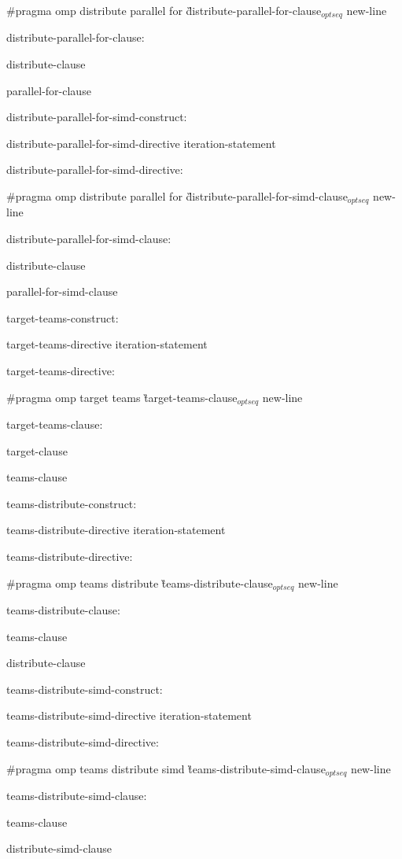 {\C\I \#pragma omp distribute parallel for \G distribute-parallel-for-clause$_{optseq}$ new-line

\I distribute-parallel-for-clause:

\I\I distribute-clause

\I\I parallel-for-clause

\I distribute-parallel-for-simd-construct:

\I\I distribute-parallel-for-simd-directive iteration-statement

\I distribute-parallel-for-simd-directive:

\C\I\I \#pragma omp distribute parallel for \G distribute-parallel-for-simd-clause$_{optseq}$ new-line

\I distribute-parallel-for-simd-clause:

\I\I distribute-clause

\I\I parallel-for-simd-clause

\I target-teams-construct:

\I\I target-teams-directive iteration-statement

\I target-teams-directive:

\C\I\I \#pragma omp target teams \G target-teams-clause$_{optseq}$ new-line

\I target-teams-clause:

\I\I target-clause

\I\I teams-clause

\I teams-distribute-construct:

\I\I teams-distribute-directive iteration-statement

\I teams-distribute-directive:

\C\I\I \#pragma omp teams distribute \G teams-distribute-clause$_{optseq}$ new-line

\I teams-distribute-clause:

\I\I teams-clause

\I\I distribute-clause

\I teams-distribute-simd-construct:

\I\I teams-distribute-simd-directive iteration-statement

\I teams-distribute-simd-directive:

\C\I \#pragma omp teams distribute simd \G teams-distribute-simd-clause$_{optseq}$ new-line

\I teams-distribute-simd-clause:

\I\I teams-clause

\I\I distribute-simd-clause

}

